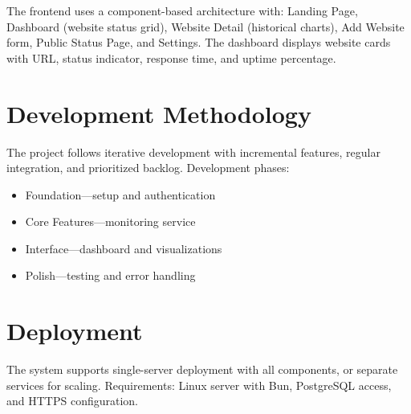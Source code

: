 The frontend uses a component-based architecture with: Landing Page, Dashboard (website status grid), Website Detail (historical charts), Add Website form, Public Status Page, and Settings. The dashboard displays website cards with URL, status indicator, response time, and uptime percentage.

\section{Development Methodology}

The project follows iterative development with incremental features, regular integration, and prioritized backlog. Development phases:
\begin{itemize}
    \item Foundation---setup and authentication
    \item Core Features---monitoring service
    \item Interface---dashboard and visualizations
    \item Polish---testing and error handling
\end{itemize}

\section{Deployment}

The system supports single-server deployment with all components, or separate services for scaling. Requirements: Linux server with Bun, PostgreSQL access, and HTTPS configuration.
